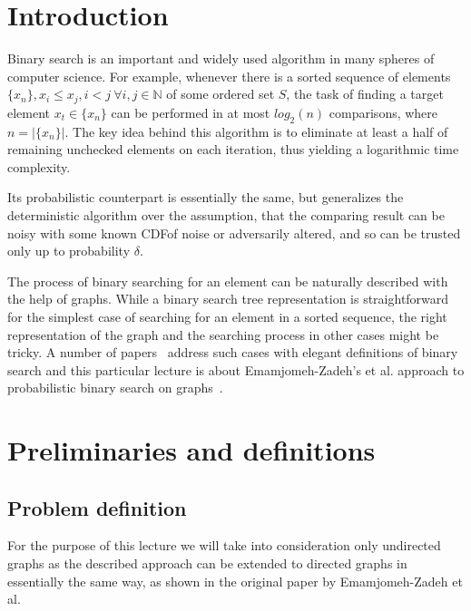 

\maketitle

\section{Introduction}
Binary search is an important and widely used algorithm in many spheres of computer science. For example, whenever there is a sorted sequence of elements $\{x_n\}, x_i \le x_j, i < j~\forall i,j \in \mathds{N}$ of some ordered set $S$, the task of finding a target element $x_t \in \{x_n\}$ can be performed in at most $log_2(n)$ comparisons, where $n = |\{x_n\}|$. The key idea behind this algorithm is to eliminate at least a half of remaining unchecked elements on each iteration, thus yielding a logarithmic time complexity.


Its probabilistic counterpart is essentially the same, but generalizes the deterministic algorithm over the assumption, that the comparing result can be noisy with some known CDF\footnotemark[1] of noise or adversarily altered, and so can be trusted only up to probability $\delta$.


The process of binary searching for an element can be naturally described with the help of graphs. While a binary search tree representation is straightforward for the simplest case of searching for an element in a sorted sequence, the right representation of the graph and the searching process in other cases might be tricky. A number of papers~\cite{main, karp, benor} address such cases with elegant definitions of binary search and this particular lecture is about Emamjomeh-Zadeh's et al. approach to probabilistic binary search on graphs~\cite{main}.

\clearpage

\section{Preliminaries and definitions}
\subsection*{Problem definition}
For the purpose of this lecture we will take into consideration only undirected graphs as the described approach can be extended to directed graphs in essentially the same way, as shown in the original paper by Emamjomeh-Zadeh et al.



